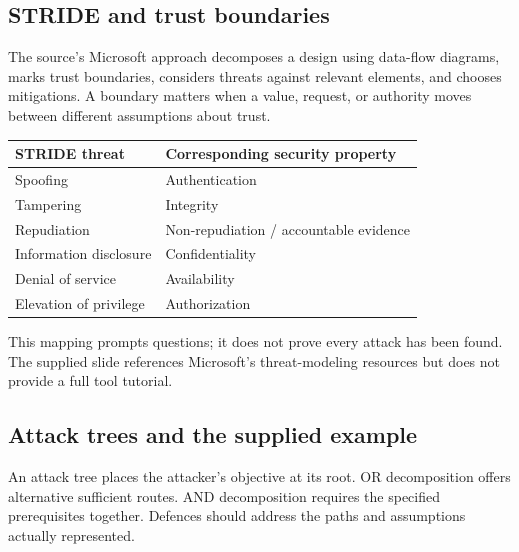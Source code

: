 \documentclass[11pt,a4paper]{article}
\numberwithin{figure}{section}
\begin{document}
\subsection{STRIDE and trust boundaries}
The source's Microsoft approach decomposes a design using data-flow diagrams, marks trust boundaries, considers threats against relevant elements, and chooses mitigations. A boundary matters when a value, request, or authority moves between different assumptions about trust.
\begin{center}\begin{tabular}{@{}ll@{}}\toprule
STRIDE threat & Corresponding security property\\\midrule
Spoofing & Authentication\\
Tampering & Integrity\\
Repudiation & Non-repudiation / accountable evidence\\
Information disclosure & Confidentiality\\
Denial of service & Availability\\
Elevation of privilege & Authorization\\\bottomrule
\end{tabular}\end{center}
This mapping prompts questions; it does not prove every attack has been found. The supplied slide references Microsoft's threat-modeling resources but does not provide a full tool tutorial.

\subsection{Attack trees and the supplied example}
An attack tree places the attacker's objective at its root. OR decomposition offers alternative sufficient routes. AND decomposition requires the specified prerequisites together. Defences should address the paths and assumptions actually represented.
\end{document}
